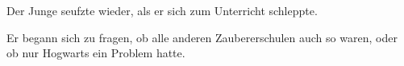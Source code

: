 Der Junge seufzte wieder, als er sich zum Unterricht schleppte.

Er begann sich zu fragen, ob alle anderen Zaubererschulen auch so waren, oder ob nur Hogwarts ein Problem hatte.

